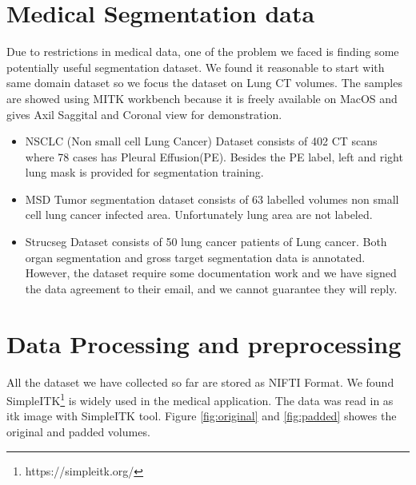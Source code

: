\section{Medical Segmentation data}
Due to restrictions in medical data, one of the problem we faced is finding some potentially useful segmentation dataset. We found it reasonable to start with same domain dataset so we focus the dataset on Lung CT volumes. The samples are showed using MITK workbench because it is freely available on MacOS and gives Axil Saggital and Coronal view for demonstration.
\begin{itemize}
	\item NSCLC (Non small cell Lung Cancer) Dataset consists of 402 CT scans where 78 cases has Pleural Effusion(PE). Besides the PE label, left and right lung mask is provided for segmentation training.
	\item MSD Tumor segmentation dataset consists of 63 labelled volumes non small cell lung cancer infected area. Unfortunately lung area are not labeled.
	\item Strucseg Dataset consists of 50 lung cancer patients of Lung cancer. Both organ segmentation and gross target segmentation data is annotated. However, the dataset require some documentation work and we have signed the data agreement to their email, and we cannot guarantee they will reply.
	\end{itemize}
\section{Data Processing and preprocessing}
All the dataset we have collected so far are stored as NIFTI Format. We found SimpleITK\footnote{https://simpleitk.org/} is widely used in the medical application. The data was read in as itk image with SimpleITK tool. Figure \ref{fig:original} and \ref{fig:padded} showes the original and padded volumes.
